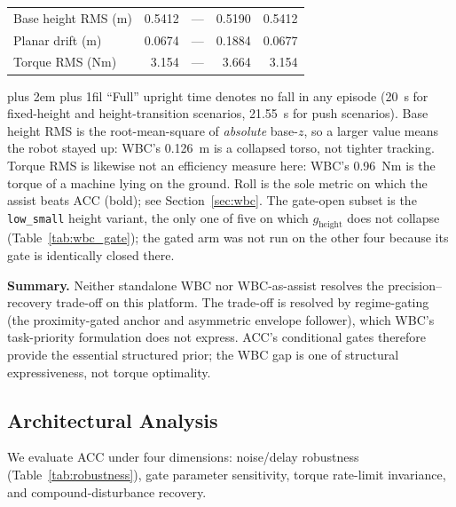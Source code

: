 \documentclass[a4paper,fleqn]{cas-dc}
\newcommand{\tabnote}{\par\leftskip=0pt\rightskip=0pt plus 2em%
  \parfillskip=0pt plus 1fil\relax}
\begin{document}
\begin{table}[pos=!tbp]
\begin{tabular}{@{}>{\raggedright\arraybackslash}p{}rrrr@{}}
Base height RMS (m)        & 0.5412 & --- & 0.5190 & 0.5412 \\
Planar drift (m)           & 0.0674 & --- & 0.1884 & 0.0677 \\
Torque RMS (Nm)            & 3.154  & --- & 3.664  & 3.154 \\
\bottomrule
\end{tabular}
\vspace{4pt}\tabnote\noindent\footnotesize
``Full'' upright time denotes no fall in any episode (\SI{20}{s} for fixed-height and height-transition scenarios, \SI{21.55}{s} for push scenarios).
Base height RMS is the root-mean-square of \emph{absolute} base-$z$, so a larger value means the robot stayed up: WBC's \SI{0.126}{m} is a collapsed torso, not tighter tracking.
Torque RMS is likewise not an efficiency measure here: WBC's \SI{0.96}{Nm} is the torque of a machine lying on the ground.
Roll is the sole metric on which the assist beats ACC (bold); see Section~\ref{sec:wbc}.
The gate-open subset is the \texttt{low\_small} height variant, the only one of five on which $g_{\text{height}}$ does not collapse (Table~\ref{tab:wbc_gate}); the gated arm was not run on the other four because its gate is identically closed there.
\end{table}

\medskip\noindent\textbf{Summary.}
Neither standalone WBC nor WBC-as-assist resolves the precision--recovery trade-off on this platform.
The trade-off is resolved by regime-gating (the proximity-gated anchor and asymmetric envelope follower), which WBC's task-priority formulation does not express.
ACC's conditional gates therefore provide the essential structured prior; the WBC gap is one of structural expressiveness, not torque optimality.



\subsection{Architectural Analysis}
\label{sec:analysis}

We evaluate ACC under four dimensions: noise/delay robustness (Table~\ref{tab:robustness}), gate parameter sensitivity, torque rate-limit invariance, and compound-disturbance recovery.
\end{document}
